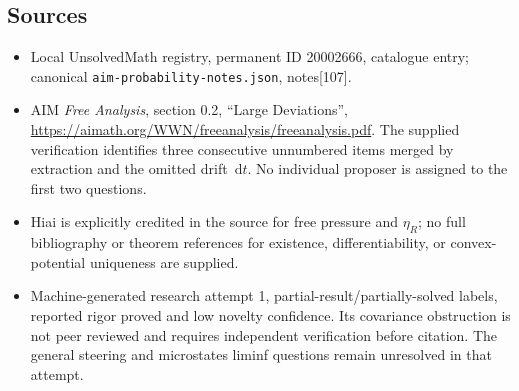 \documentclass[11pt]{article}
\newcommand{\dd}{\,\mathrm{d}}
\begin{document}
\subsection{Sources}
\begin{itemize}
\item Local UnsolvedMath registry, permanent ID 20002666, catalogue entry; canonical \texttt{aim-probability-notes.json}, notes[107].
\item AIM \emph{Free Analysis}, section 0.2, ``Large Deviations'', \url{https://aimath.org/WWN/freeanalysis/freeanalysis.pdf}. The supplied verification identifies three consecutive unnumbered items merged by extraction and the omitted drift \(\dd t\). No individual proposer is assigned to the first two questions.
\item Hiai is explicitly credited in the source for free pressure and \(\eta_R\); no full bibliography or theorem references for existence, differentiability, or convex-potential uniqueness are supplied.
\item Machine-generated research attempt 1, partial-result/partially-solved labels, reported rigor proved and low novelty confidence. Its covariance obstruction is not peer reviewed and requires independent verification before citation. The general steering and microstates liminf questions remain unresolved in that attempt.
\end{itemize}
\end{document}
